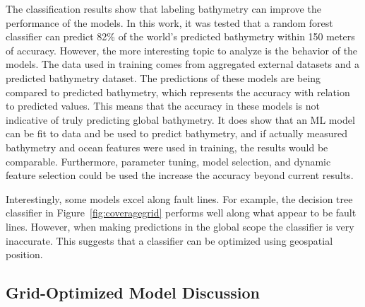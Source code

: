 \par
The classification results show that labeling bathymetry can improve the performance of the models.
In this work, it was tested that a random forest classifier can predict 82\% of the world's predicted bathymetry within 150 meters of accuracy. 
However, the more interesting topic to analyze is the behavior of the models.
The data used in training comes from aggregated external datasets and a predicted bathymetry dataset.
The predictions of these models are being compared to predicted bathymetry, which represents the accuracy with relation to predicted values.
This means that the accuracy in these models is not indicative of truly predicting global bathymetry.
It does show that an \ac{ML} model can be fit to data and be used to predict bathymetry, and if actually measured bathymetry and ocean features were used in training, the results would be comparable.
Furthermore, parameter tuning, model selection, and dynamic feature selection could be used the increase the accuracy beyond current results.

\par
Interestingly, some models excel along fault lines.
For example, the decision tree classifier in Figure~\ref{fig:coveragegrid} performs well along what appear to be fault lines.
However, when making predictions in the global scope the classifier is very inaccurate.
This suggests that a classifier can be optimized using geospatial position.



\subsection{Grid-Optimized Model Discussion}


